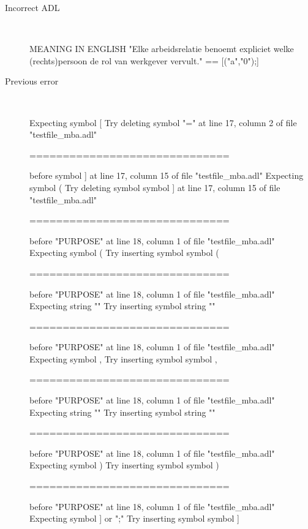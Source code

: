 \begin{description}
  \item[Incorrect ADL]~\\
\begin{adl}
MEANING IN ENGLISH "Elke arbeidsrelatie benoemt expliciet welke (rechts)persoon de rol van werkgever vervult."
== [("a","0");]     \end{adl}
  \item[Previous error]~\\
\begin{haskell}
Expecting symbol [
Try deleting symbol "=" at line 17, column 2 of file "testfile_mba.adl"

==============================

before symbol ] at line 17, column 15 of file "testfile_mba.adl"
Expecting symbol (
Try deleting symbol symbol ] at line 17, column 15 of file "testfile_mba.adl"

==============================

before "PURPOSE" at line 18, column 1 of file "testfile_mba.adl"
Expecting symbol (
Try inserting symbol symbol (

==============================

before "PURPOSE" at line 18, column 1 of file "testfile_mba.adl"
Expecting string ""
Try inserting symbol string ""

==============================

before "PURPOSE" at line 18, column 1 of file "testfile_mba.adl"
Expecting symbol ,
Try inserting symbol symbol ,

==============================

before "PURPOSE" at line 18, column 1 of file "testfile_mba.adl"
Expecting string ""
Try inserting symbol string ""

==============================

before "PURPOSE" at line 18, column 1 of file "testfile_mba.adl"
Expecting symbol )
Try inserting symbol symbol )

==============================

before "PURPOSE" at line 18, column 1 of file "testfile_mba.adl"
Expecting symbol ] or ";"
Try inserting symbol symbol ]


\end{haskell}
\end{description}
